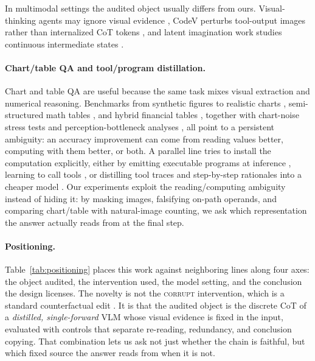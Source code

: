 \documentclass[11pt]{article}
\newcommand{\corrupt}{\textsc{corrupt}}
\begin{document}
In multimodal settings the audited object usually differs from ours. Visual-thinking agents may ignore visual evidence \citep{visualthinking2025}, CodeV perturbs tool-output images rather than internalized CoT tokens \citep{codev}, and latent imagination work studies continuous intermediate states \citep{capimagine2026}.

\paragraph{Chart/table QA and tool/program distillation.}
Chart and table QA are useful because the same task mixes visual extraction and numerical reasoning. Benchmarks from synthetic figures \citep{kafle2018dvqa,kahou2018figureqa,methani2020plotqa} to realistic charts \citep{chartqa,charxiv,chartmuseum}, semi-structured math tables \citep{tabmwp}, and hybrid financial tables \citep{zhu2021tatqa,chen2021finqa}, together with chart-noise stress tests \citep{chartnoise} and perception-bottleneck analyses \citep{perceptionbottleneck}, all point to a persistent ambiguity: an accuracy improvement can come from reading values better, computing with them better, or both. A parallel line tries to install the computation explicitly, either by emitting executable programs at inference \citep{gao2023pal,chen2023pot}, learning to call tools \citep{schick2023toolformer}, or distilling tool traces and step-by-step rationales into a cheaper model \citep{vpd,hsieh2023distilling}. Our experiments exploit the reading/computing ambiguity instead of hiding it: by masking images, falsifying on-path operands, and comparing chart/table with natural-image counting, we ask which representation the answer actually reads from at the final step.

\paragraph{Positioning.}
Table~\ref{tab:positioning} places this work against neighboring lines along four axes: the object audited, the intervention used, the model setting, and the conclusion the design licenses. The novelty is not the \corrupt{} intervention, which is a standard counterfactual edit \citep{lanham2023}. It is that the audited object is the discrete CoT of a \emph{distilled, single-forward} VLM whose visual evidence is fixed in the input, evaluated with controls that separate re-reading, redundancy, and conclusion copying. That combination lets us ask not just whether the chain is faithful, but which fixed source the answer reads from when it is not.
\end{document}
